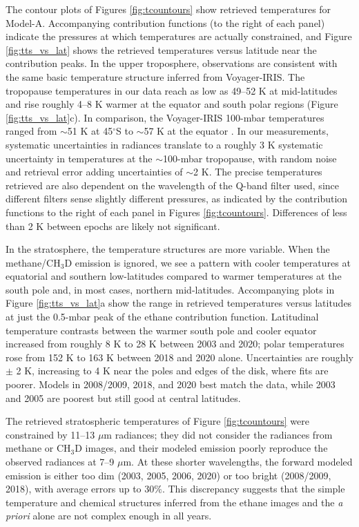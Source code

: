 \documentclass[twocolumn,10pt]{aastex631}
\begin{document}
The contour plots of Figures \ref{fig:tcountours} show retrieved temperatures for Model-A. Accompanying contribution functions (to the right of each panel) indicate the pressures at which temperatures are actually constrained, and Figure \ref{fig:tts_vs_lat} shows the retrieved temperatures versus latitude near the contribution peaks. In the upper troposphere, observations are consistent with the same basic temperature structure inferred from Voyager-IRIS. The tropopause temperatures in our data reach as low as 49--52 K at mid-latitudes and rise roughly 4--8 K warmer at the equator and south polar regions (Figure \ref{fig:tts_vs_lat}c).  In comparison, the Voyager-IRIS 100-mbar temperatures ranged from  $\sim$51 K at 45$^{\circ}$S to $\sim$57 K at the equator \citep{conrath1998thermal,fletcher2014neptune}. In our measurements, systematic uncertainties in radiances translate to a roughly 3 K systematic uncertainty in temperatures at the $\sim$100-mbar tropopause, with random noise and retrieval error adding uncertainties of $\sim$2 K.  The precise temperatures retrieved are also dependent on the wavelength of the Q-band filter used, since different filters sense slightly different pressures, as indicated by the contribution functions to the right of each panel in Figures \ref{fig:tcountours}. Differences of less than 2 K between epochs are likely not significant.

In the stratosphere, the temperature structures are more variable. When the methane/CH$_3$D emission is ignored, we see a pattern with cooler temperatures at equatorial and southern low-latitudes compared to warmer temperatures at the south pole and, in most cases, northern mid-latitudes.  Accompanying plots in Figure \ref{fig:tts_vs_lat}a show the range in retrieved temperatures versus latitudes at just the 0.5-mbar peak of the ethane contribution function. Latitudinal temperature contrasts between the warmer south pole and cooler equator increased from roughly 8 K to 28 K between 2003 and 2020; polar temperatures rose from 152 K to 163 K between 2018 and 2020 alone.  Uncertainties are roughly $\pm$ 2 K, increasing to 4 K near the poles and edges of the disk, where fits are poorer.  Models in 2008/2009, 2018, and 2020 best match the data, while 2003 and 2005 are poorest but still good at central latitudes. 

The retrieved stratospheric temperatures of Figure \ref{fig:tcountours} were constrained by 11--13 $\mu$m radiances; they did not consider the radiances from methane or CH$_3$D images, and their modeled emission poorly reproduce the observed radiances at 7--9 $\mu$m. At these shorter wavelengths, the forward modeled emission is either too dim (2003, 2005, 2006, 2020) or too bright (2008/2009, 2018), with average errors up to 30$\%$. This discrepancy suggests that the simple temperature and chemical structures inferred from the ethane images and the \textit{a priori} alone are not complex enough in all years.  
\end{document}
